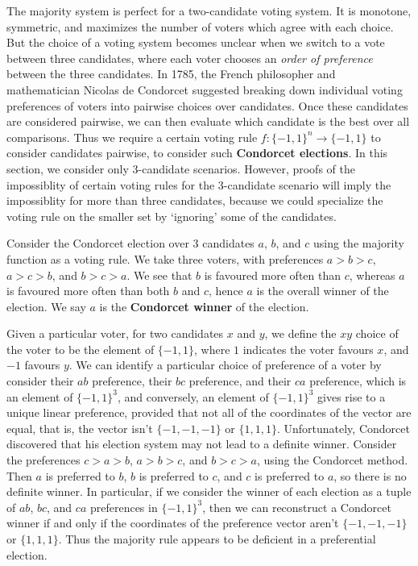 The majority system is perfect for a two-candidate voting system. It is monotone, symmetric, and maximizes the number of voters which agree with each choice. But the choice of a voting system becomes unclear when we switch to a vote between three candidates, where each voter chooses an {\it order of preference} between the three candidates. In 1785, the French philosopher and mathematician Nicolas de Condorcet suggested breaking down individual voting preferences of voters into pairwise choices over candidates. Once these candidates are considered pairwise, we can then evaluate which candidate is the best over all comparisons. Thus we require a certain voting rule $f: \{ -1, 1 \}^n \to \{ -1, 1 \}$ to consider candidates pairwise, to consider such {\bf Condorcet elections}. In this section, we consider only 3-candidate scenarios. However, proofs of the impossiblity of certain voting rules for the 3-candidate scenario will imply the impossiblity for more than three candidates, because we could specialize the voting rule on the smaller set by `ignoring' some of the candidates.

\begin{example}
    Consider the Condorcet election over 3 candidates $a$, $b$, and $c$ using the majority function as a voting rule. We take three voters, with preferences $a > b > c$, $a > c > b$, and $b > c > a$. We see that $b$ is favoured more often than $c$, whereas $a$ is favoured more often than both $b$ and $c$, hence $a$ is the overall winner of the election. We say $a$ is the {\bf Condorcet winner} of the election.
\end{example}

Given a particular voter, for two candidates $x$ and $y$, we define the $xy$ choice of the voter to be the element of $\{ -1, 1 \}$, where $1$ indicates the voter favours $x$, and $-1$ favours $y$. We can identify a particular choice of preference of a voter by consider their $ab$ preference, their $bc$ preference, and their $ca$ preference, which is an element of $\{ -1, 1 \}^3$, and conversely, an element of $\{ -1, 1 \}^3$ gives rise to a unique linear preference, provided that not all of the coordinates of the vector are equal, that is, the vector isn't $\{ -1, -1, -1 \}$ or $\{ 1, 1, 1 \}$. Unfortunately, Condorcet discovered that his election system may not lead to a definite winner. Consider the preferences $c > a > b$, $a > b > c$, and $b > c > a$, using the Condorcet method. Then $a$ is preferred to $b$, $b$ is preferred to $c$, and $c$ is preferred to $a$, so there is no definite winner. In particular, if we consider the winner of each election as a tuple of $ab$, $bc$, and $ca$ preferences in $\{ -1, 1 \}^3$, then we can reconstruct a Condorcet winner if and only if the coordinates of the preference vector aren't $\{ -1, -1, -1 \}$ or $\{ 1, 1, 1 \}$. Thus the majority rule appears to be deficient in a preferential election.

